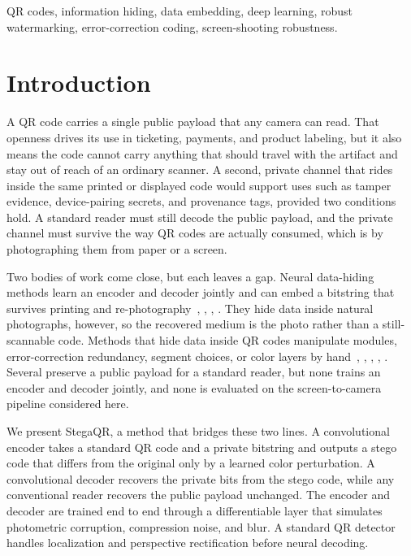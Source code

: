 \documentclass[conference]{IEEEtran}
\begin{document}
\begin{IEEEkeywords}
QR codes, information hiding, data embedding, deep learning, robust watermarking,
error-correction coding, screen-shooting robustness.
\end{IEEEkeywords}

\section{Introduction}
A QR code carries a single public payload that any camera can read. That openness
drives its use in ticketing, payments, and product labeling, but it also means the
code cannot carry anything that should travel with the artifact and stay out of reach
of an ordinary scanner. A second, private channel that rides inside the same
printed or displayed code would support uses such as tamper evidence, device-pairing
secrets, and provenance tags, provided two conditions hold. A standard reader must
still decode the public payload, and the private channel must survive the way QR codes
are actually consumed, which is by photographing them from paper or a screen.

Two bodies of work come close, but each leaves a gap. Neural data-hiding methods learn
an encoder and decoder jointly and can embed a bitstring that survives printing and
re-photography~\cite{baluja2017hiding}, \cite{zhu2018hidden},
\cite{tancik2020stegastamp}, \cite{bui2023rosteals}.
They hide data inside natural photographs, however, so the recovered medium is the photo
rather than a still-scannable code. Methods that hide data inside QR codes manipulate
modules, error-correction redundancy, segment choices, or color layers by
hand~\cite{lin2016qr}, \cite{koptyra2024segmentation},
\cite{tkachenko2016twolevel}, \cite{yang2018hiq}, \cite{chu2013halftone}. Several
preserve a public payload for a standard reader, but none trains an encoder and decoder
jointly, and none is evaluated on the screen-to-camera pipeline considered here.

We present StegaQR, a method that bridges these two lines. A convolutional encoder takes
a standard QR code and a private bitstring and outputs a stego code that differs from the
original only by a learned color perturbation. A convolutional decoder recovers the
private bits from the stego code, while any conventional reader recovers the public
payload unchanged. The encoder and decoder are trained end to end through a differentiable
layer that simulates photometric corruption, compression noise, and blur. A standard QR
detector handles localization and perspective rectification before neural decoding.
\end{document}
